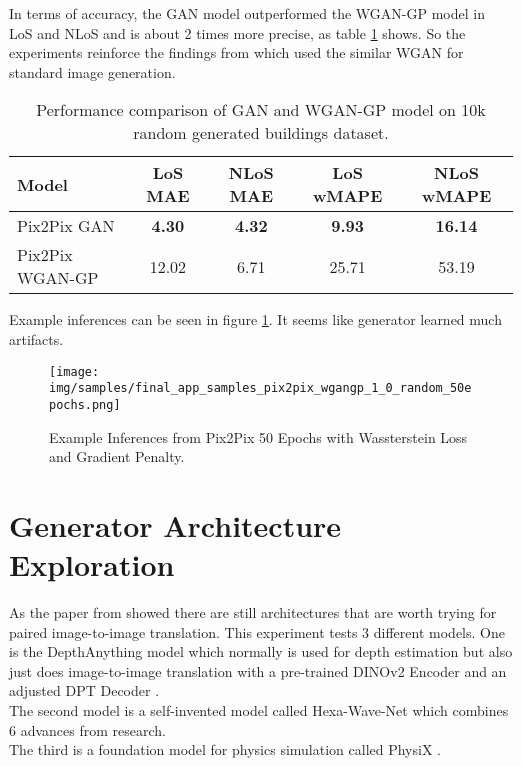 		In terms of accuracy, the GAN model outperformed the WGAN-GP model in LoS and NLoS and is about 2 times more precise, as table \ref{tab:performance_wgangp} shows. So the experiments reinforce the findings from  which used the similar WGAN for standard image generation.
		
		\begin{table}[h!]
			\centering
			\begin{tabular}{|l|c|c|c|c|}
				\hline
				\textbf{Model} & \textbf{LoS MAE} & \textbf{NLoS MAE} & \textbf{LoS wMAPE} & \textbf{NLoS wMAPE} \\
				\hline
				Pix2Pix GAN & \textbf{4.30} & \textbf{4.32} & \textbf{9.93} & \textbf{16.14} \\
				Pix2Pix WGAN-GP & 12.02 & 6.71 & 25.71 & 53.19 \\
				\hline
			\end{tabular}
			\caption{Performance comparison of GAN and WGAN-GP model on 10k random generated buildings dataset.}
			\label{tab:performance_wgangp}
		\end{table}
		
		Example inferences can be seen in figure \ref{fig:example_wgangp}. It seems like generator learned much artifacts.
		\begin{figure}[H]
			\centering
			\texttt{[image: img/samples/final\_app\_samples\_pix2pix\_wgangp\_1\_0\_random\_50epochs.png]}
			\caption[Example Inferences from Pix2Pix 50 Epochs with Wassterstein Loss and Gradient Penalty.]{Example Inferences from Pix2Pix 50 Epochs with Wassterstein Loss and Gradient Penalty.}
			\label{fig:example_wgangp}
		\end{figure}
		\FloatBarrier
		
	\clearpage
		
	\section{Generator Architecture Exploration}
	\label{sec:experiments-generator_architecture_exploration}
		As the paper from \citeauthor{achim_eckerle_evaluierung_2025} showed there are still architectures that are worth trying for paired image-to-image translation. This experiment tests 3 different models. One is the DepthAnything model \cite{yang2024depthv2} which normally is used for depth estimation but also just does image-to-image translation with a pre-trained DINOv2 Encoder \cite{oquab2024dinov2learningrobustvisual} and an adjusted DPT Decoder \cite{ranftl2021visiontransformersdenseprediction}.\\
		The second model is a self-invented model called Hexa-Wave-Net which combines 6 advances from research.\\
		The third is a foundation model for physics simulation called PhysiX \cite{nguyen2025physixfoundationmodelphysics}.
		
